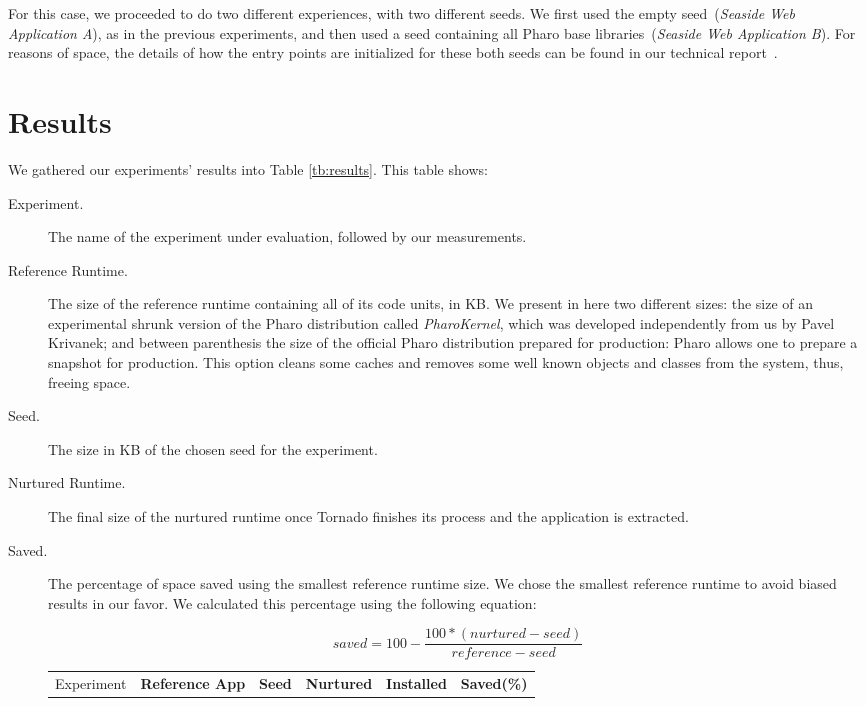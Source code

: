 For this case, we proceeded to do two different experiences, with two different seeds. We first used the empty seed~(\emph{Seaside Web Application A}), as in the previous experiments, and then used a seed containing all Pharo base libraries~(\emph{Seaside Web Application B}). For reasons of space, the details of how the entry points are initialized for these both seeds can be found in our technical report~\cite{Poli14a}.

\section{Results} \label{sec:results_discussion}

We gathered our experiments' results into Table \ref{tb:results}. This table shows:
\begin{description}
\item[Experiment.] The name of the experiment under evaluation, followed by our measurements.
\item[Reference Runtime.] The size of the reference runtime containing all of its code units, in KB. We present in here two different sizes: the size of an experimental shrunk version of the Pharo distribution called \emph{PharoKernel}, which was developed independently from us by Pavel Krivanek; and between parenthesis the size of the official Pharo distribution prepared for production: Pharo allows one to prepare a snapshot for production. This option cleans some caches and removes some well known objects and classes from the system, thus, freeing space.
\item[Seed.] The size in KB of the chosen seed for the experiment.
\item[Nurtured Runtime.] The final size of the nurtured runtime once Tornado finishes its process and the application is extracted.
\item[Saved.] The percentage of space saved using the smallest reference runtime size. We chose the smallest reference runtime to avoid biased results in our favor. We calculated this percentage using the following equation:

\begin{equation*}
saved = 100 - \frac{100*(nurtured - seed)}{reference - seed}
\end{equation*}

\begin{table}[ht]
 	\centering
 	\begin{tabular}{lccccc}
		\toprule
			Experiment
 			& \textbf{Reference App}
			& \textbf{Seed}
			& \textbf{Nurtured}
			& \textbf{Installed}
			& \textbf{Saved(\%)}\\
			

\end{tabular}
\end{table}
\end{description}
